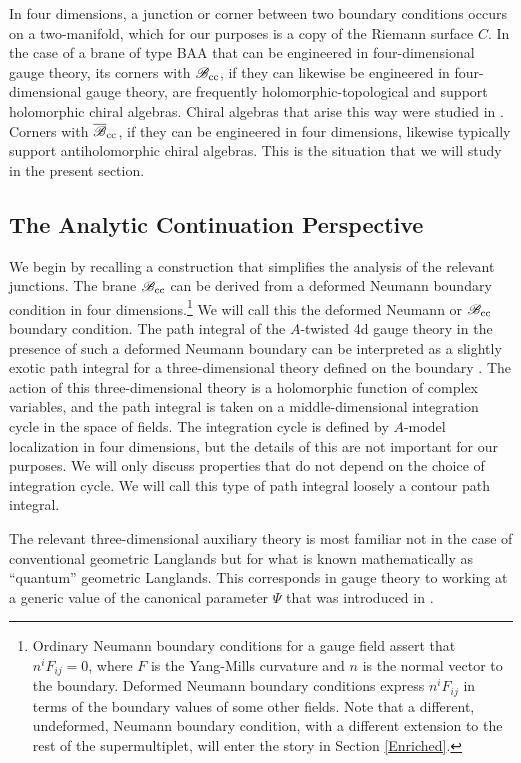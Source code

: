 \documentclass[11pt,a4paper]{article}
\begin{document}
In four dimensions, a junction or corner between two boundary conditions occurs on a two-manifold, which for our purposes is a copy of
the Riemann surface $C$.   In the case of a brane of type BAA that can be engineered in four-dimensional gauge theory, its corners
with ${\mathscr B}_{\mathrm{cc}}$, if they can likewise be engineered in four-dimensional gauge theory, are frequently holomorphic-topological and support
holomorphic chiral algebras. Chiral algebras that arise this way were studied in   \cite{Gaiotto:2016hvd,FG}.
  Corners with $\overline{{\mathscr B}}_{\mathrm{cc}}$, if they can be engineered in four dimensions, likewise typically support antiholomorphic
chiral algebras.   This is the situation that we will study in the present section.





\subsection{The Analytic Continuation Perspective}\label{ACP}
We begin by recalling a construction that simplifies the analysis of the relevant junctions.   The brane ${\mathscr B}_{\mathrm{cc}}$ can be derived
from a deformed Neumann boundary condition in four dimensions.\footnote{\label{deformed} Ordinary Neumann boundary conditions for a gauge field assert that 
$n^i F_{ij}=0$, where $F$ is the Yang-Mills curvature and $n$ is the normal vector to the boundary.   Deformed Neumann boundary conditions
express $n^i F_{ij}$ in terms of the boundary values of some other fields.  Note that a different, undeformed, Neumann boundary condition,
with a different extension to the rest of the supermultiplet, will enter the story in Section \ref{Enriched}.}    We will call this the deformed Neumann or ${\mathscr B}_{\mathrm{cc}}$ boundary condition.
The path integral of the $A$-twisted 4d gauge theory in the presence of such a deformed Neumann  boundary can be interpreted as 
a slightly exotic path integral for a three-dimensional theory defined on the boundary   \cite{Witten:2010zr,Witten:2011zz}.
  The action of this three-dimensional theory  is a holomorphic function of complex
variables, and the path integral is taken on a middle-dimensional integration cycle in the space of  fields.   The integration cycle is defined
by $A$-model localization in four dimensions, but the details of this are not important for our purposes.   We will only discuss properties that
do not depend on the choice of integration cycle.  We will call this type of path integral loosely a contour path integral.

The relevant three-dimensional auxiliary theory is most familiar not in the case  of  conventional geometric
Langlands but for what is known mathematically as ``quantum'' geometric Langlands.   This corresponds in gauge theory to working at a generic
value of the canonical parameter $\Psi$ that was introduced in \cite{KW}.   
\end{document}
